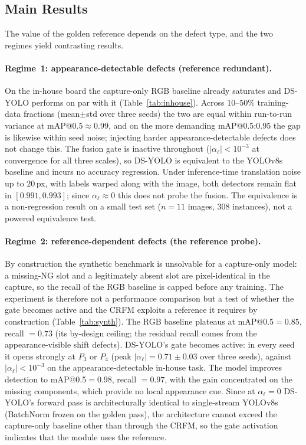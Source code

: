 \documentclass[conference]{IEEEtran}
\begin{document}
\subsection{Main Results}
\label{sec:main_results}
The value of the golden reference depends on the defect type, and the two regimes
yield contrasting results.

\paragraph*{Regime~1: appearance-detectable defects (reference redundant).}
On the in-house board the capture-only RGB baseline already saturates and DS-YOLO
performs on par with it (Table~\ref{tab:inhouse}). Across
$10$--$50\%$ training-data fractions (mean$\pm$std over three seeds) the two are
equal within run-to-run variance at mAP@0.5${\approx}0.99$, and on the more
demanding mAP@0.5:0.95 the gap is likewise within seed noise; injecting harder
appearance-detectable defects does not change this. The fusion gate is inactive
throughout ($|\alpha_\ell|\!<\!10^{-3}$ at convergence for all three scales), so
DS-YOLO is equivalent to the YOLOv8s baseline and incurs no accuracy regression.
Under inference-time translation noise up to $20$\,px, with labels warped along
with the image, both detectors remain flat in $[0.991,0.993]$; since
$\alpha_\ell\!\approx\!0$ this does not probe the fusion. The equivalence is a
non-regression result on a small test set ($n\!=\!11$ images, $308$ instances),
not a powered equivalence test.

\paragraph*{Regime~2: reference-dependent defects (the reference probe).}
By construction the synthetic benchmark is unsolvable for a capture-only model: a
missing-NG slot and a legitimately absent slot are pixel-identical in the capture,
so the recall of the RGB baseline is capped before any training. The experiment is
therefore not a performance comparison but a test of whether the gate becomes
active and the CRFM exploits a reference it requires by construction
(Table~\ref{tab:synth}). The RGB baseline plateaus at mAP@0.5$=0.85$, recall
$=0.73$ (its by-design ceiling; the residual recall comes from the
appearance-visible shift defects). DS-YOLO's gate becomes active: in every seed
it opens strongly at $P_3$ or $P_4$ (peak $|\alpha_\ell|=0.71\pm0.03$ over three
seeds), against $|\alpha_\ell|\!<\!10^{-3}$ on the appearance-detectable in-house
task. The model improves detection to mAP@0.5$=0.98$, recall $=0.97$, with the
gain concentrated on the missing components, which provide no local appearance
cue. Since at $\alpha_\ell\!=\!0$ DS-YOLO's forward
pass is architecturally identical to single-stream YOLOv8s (BatchNorm frozen on
the golden pass), the architecture cannot exceed the capture-only baseline other
than through the CRFM, so the gate activation indicates that the module uses the
reference.
\end{document}
